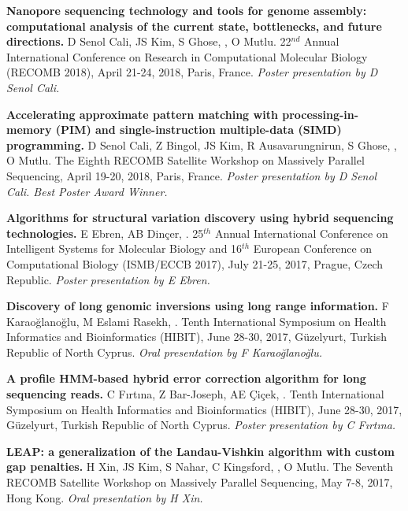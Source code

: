 \vspace{-.2cm}
       {\bf Nanopore sequencing technology and tools for genome assembly: computational analysis of the current state, bottlenecks, and future directions.}
       D Senol Cali, JS Kim, S Ghose, \calkan{}, O Mutlu.
       22$^{nd}$ Annual International Conference on Research in Computational Molecular Biology (RECOMB 2018), April 21-24, 2018, Paris, France.
       {\it Poster presentation by D Senol Cali.}

\vspace{-.2cm}
       {\bf Accelerating approximate pattern matching with processing-in-memory (PIM) and single-instruction multiple-data (SIMD) programming.}
       D Senol Cali, Z Bingol, JS Kim, R Ausavarungnirun, S Ghose, \calkan{},
       O Mutlu.
       The Eighth RECOMB Satellite Workshop on Massively Parallel Sequencing, April 19-20, 2018,
       Paris, France.
       {\it Poster presentation by D Senol Cali. Best Poster Award Winner.}

\vspace{-.2cm}
       {\bf Algorithms for structural variation discovery using hybrid sequencing technologies.}
       E Ebren, AB Dinçer, \calkan{}.
       25$^{th}$ Annual International Conference on Intelligent Systems for Molecular Biology and 16$^{th}$ European Conference on 
       Computational Biology  (ISMB/ECCB 2017), 
       July 21-25, 2017, Prague, Czech Republic.
       {\it Poster presentation by E Ebren.}


\vspace{-.2cm}
       {\bf Discovery of long genomic inversions using long range information.} F Karaoğlanoğlu, M Eslami Rasekh, \calkan{}.
       Tenth International Symposium on Health Informatics and Bioinformatics (HIBIT), June 28-30, 2017, Güzelyurt, Turkish Republic of North Cyprus.
       {\it Oral presentation by F Karaoğlanoğlu.}

\vspace{-.2cm}
       {\bf A profile HMM-based hybrid error correction algorithm for long sequencing reads.} C Fırtına, Z Bar-Joseph, AE Çiçek, \calkan{}.
       Tenth International Symposium on Health Informatics and Bioinformatics (HIBIT), June 28-30, 2017, Güzelyurt, Turkish Republic of North Cyprus.
       {\it Poster presentation by C Fırtına.}

\vspace{-.2cm}
       {\bf LEAP: a generalization of the Landau-Vishkin algorithm with custom gap penalties.} H Xin, JS Kim, S Nahar, C Kingsford, \calkan{}, O Mutlu.
       The Seventh RECOMB Satellite Workshop on Massively Parallel Sequencing, May 7-8, 2017, Hong Kong.
       {\it Oral presentation by H Xin.}

